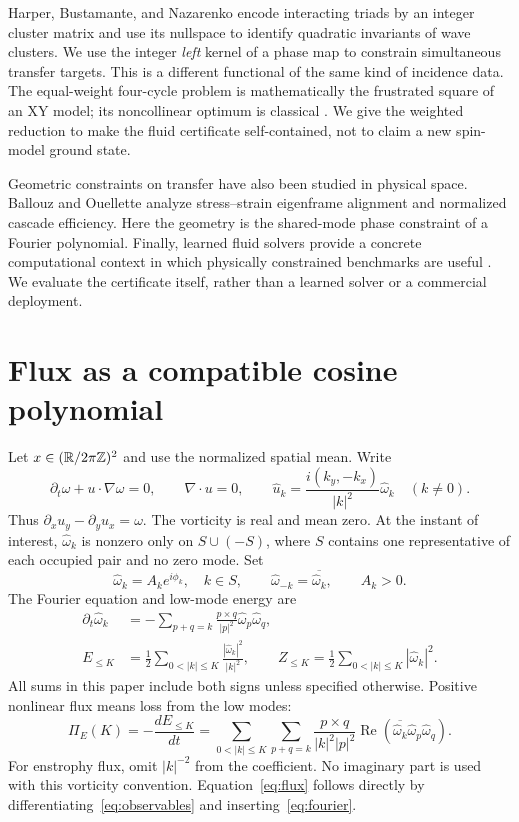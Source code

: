 \documentclass[11pt]{article}
\newcommand{\PiE}{\Pi_E}\newcommand{\PiZ}{\Pi_Z}\newcommand{\norm}[1]{\left\lVert#1\right\rVert}
\begin{document}
Harper, Bustamante, and Nazarenko \cite{harper} encode interacting triads by an integer cluster matrix and use its nullspace to identify quadratic invariants of wave clusters. We use the integer \emph{left} kernel of a phase map to constrain simultaneous transfer targets. This is a different functional of the same kind of incidence data. The equal-weight four-cycle problem is mathematically the frustrated square of an XY model; its noncollinear optimum is classical \cite{diep}. We give the weighted reduction to make the fluid certificate self-contained, not to claim a new spin-model ground state.

Geometric constraints on transfer have also been studied in physical space. Ballouz and Ouellette \cite{ballouz} analyze stress--strain eigenframe alignment and normalized cascade efficiency. Here the geometry is the shared-mode phase constraint of a Fourier polynomial. Finally, learned fluid solvers provide a concrete computational context in which physically constrained benchmarks are useful \cite{kochkov}. We evaluate the certificate itself, rather than a learned solver or a commercial deployment.

\section{Flux as a compatible cosine polynomial}\label{sec:setup}
Let $x\in(\mathbb R/2\pi\mathbb Z)^2$ and use the normalized spatial mean. Write
\begin{equation}\label{eq:pde}
 \partial_t\omega+u\cdot\nabla\omega=0,\qquad
 \nabla\cdot u=0,\qquad
 \widehat u_k=\frac{i(k_y,-k_x)}{|k|^2}\widehat\omega_k\quad(k\ne0).
\end{equation}
Thus $\partial_xu_y-\partial_yu_x=\omega$. The vorticity is real and mean zero. At the instant of interest, $\widehat\omega_k$ is nonzero only on $S\cup(-S)$, where $S$ contains one representative of each occupied pair and no zero mode. Set
\begin{equation}
 \widehat\omega_k=A_k e^{i\phi_k},\quad k\in S,\qquad
 \widehat\omega_{-k}=\overline{\widehat\omega_k},\qquad A_k>0.
\end{equation}
The Fourier equation and low-mode energy are
\begin{align}
 \partial_t\widehat\omega_k&=-\sum_{p+q=k}\frac{p\times q}{|p|^2}\widehat\omega_p\widehat\omega_q,\label{eq:fourier}\\
 E_{\le K}&=\frac12\sum_{0<|k|\le K}\frac{|\widehat\omega_k|^2}{|k|^2},\qquad
 Z_{\le K}=\frac12\sum_{0<|k|\le K}|\widehat\omega_k|^2.\label{eq:observables}
\end{align}
All sums in this paper include both signs unless specified otherwise. Positive nonlinear flux means loss from the low modes:
\begin{equation}\label{eq:flux}
 \PiE(K)=-\frac{dE_{\le K}}{dt}
 =\sum_{0<|k|\le K}\sum_{p+q=k}
 \frac{p\times q}{|k|^2|p|^2}
 \operatorname{Re}\left(\overline{\widehat\omega_k}\widehat\omega_p\widehat\omega_q\right).
\end{equation}
For enstrophy flux, omit $|k|^{-2}$ from the coefficient. No imaginary part is used with this vorticity convention. Equation~\eqref{eq:flux} follows directly by differentiating~\eqref{eq:observables} and inserting~\eqref{eq:fourier}.
\end{document}
